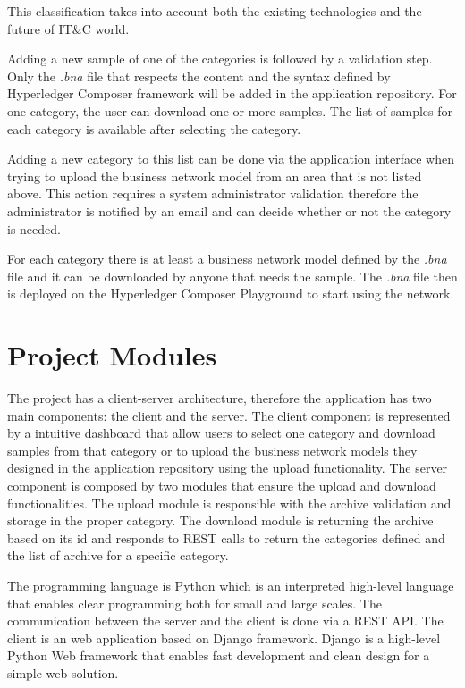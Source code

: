 This classification takes into account both the existing technologies and the future of IT\&C world.

Adding a new sample of one of the categories is followed by a validation step. Only the \emph{.bna} file that respects the content and the syntax defined by Hyperledger Composer framework will be added in the application repository.
For one category, the user can download one or more samples. The list of samples for each category is available after selecting the category.

Adding a new category to this list can be done via the application interface when trying to upload the business network model from an area that is not listed above. This action requires a system administrator validation therefore the administrator is notified by an email and can decide whether or not the category is needed.

For each category there is at least a business network model defined by the \emph{.bna} file and it can be downloaded by anyone that needs the sample.
The \emph{.bna} file then is deployed on the Hyperledger Composer Playground to start using the network.

\section{Project Modules}
\label{sub-sec:chapter3-section2}
The project has a client-server architecture, therefore the application has two main components: the client and the server.
The client component is represented by a intuitive dashboard that allow users to select one category and download samples from that category or to upload the business network models they designed in the application repository using the upload functionality.
The server component is composed by two modules that ensure the upload and download functionalities. The upload module is responsible with the archive validation and storage in the proper category. The download module is returning the archive based on its id and responds to REST calls to return the categories defined and the list of archive for a specific category.
 
The programming language is Python which is an interpreted high-level language that enables clear programming both for small and large scales.
The communication between the server and the client is done via a REST API.
The client is an web application based on Django framework. 
Django is a high-level Python Web framework that enables fast development and clean design for a simple web solution.

